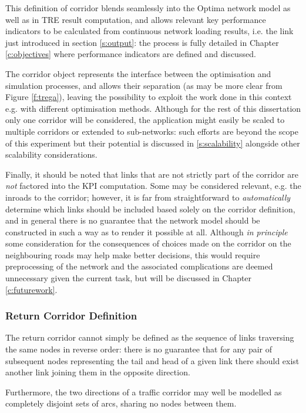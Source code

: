 This definition of corridor blends seamlessly into the Optima network model as well as in TRE result computation, and allows relevant key performance indicators to be calculated from continuous network loading results, i.e. the link  just introduced in section \ref{s:output}: the process is fully detailed in Chapter \ref{c:objectives} where performance indicators are defined and discussed.

The corridor object represents the interface between the optimisation and simulation processes, and allows their separation (as may be more clear from Figure \ref{f:trega}), leaving the possibility to exploit the work done in this context e.g. with different optimisation methods. Although for the rest of this dissertation only one corridor will be considered, the application might easily be scaled to multiple corridors or extended to sub-networks: such efforts are beyond the scope of this experiment but their potential is discussed in \ref{s:scalability} alongside other scalability considerations.

Finally, it should be noted that links that are not strictly part of the corridor are \emph{not} factored into the KPI computation. Some may be considered relevant, e.g. the inroads to the corridor; however, it is far from straightforward to \emph{automatically} determine which links should be included based solely on the corridor definition, and in general there is no guarantee that the network model should be constructed in such a way as to render it possible at all. Although \emph{in principle} some consideration for the consequences of choices made on the corridor on the neighbouring roads may help make better decisions, this would require preprocessing of the network and the associated complications are deemed unnecessary given the current task, but will be discussed in Chapter \ref{c:futurework}.

\subsubsection*{Return Corridor Definition}
The return corridor cannot simply be defined as the sequence of links traversing the same nodes in reverse order: there is no guarantee that for any pair of subsequent nodes representing the tail and head of a given link there should exist another link joining them in the opposite direction.

Furthermore, the two directions of a traffic corridor may well be modelled as completely disjoint sets of arcs, sharing no nodes between them.


